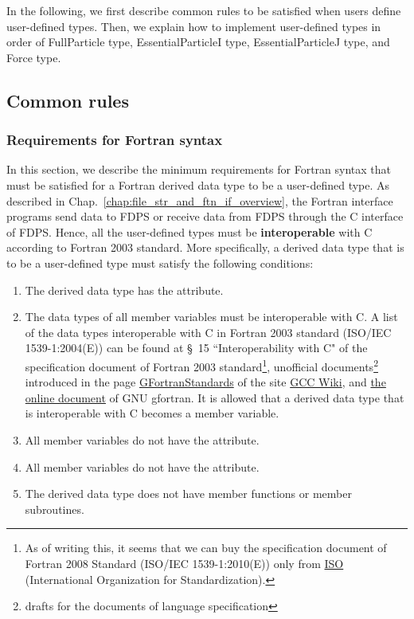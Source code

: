 In the following, we first describe common rules to be satisfied when users define user-defined types. Then, we explain how to implement user-defined types in order of FullParticle type, EssentialParticleI type, EssentialParticleJ type, and Force type.

\subsection{Common rules}
\label{subsec:common_rules_for_user_defined_types}
\subsubsection{Requirements for Fortran syntax}
\label{s2sec:requirements_for_fortran_grammer}
In this section, we describe the minimum requirements for Fortran syntax that must be satisfied for a Fortran derived data type to be a user-defined type. As described in Chap.~\ref{chap:file_str_and_ftn_if_overview}, the Fortran interface programs send data to FDPS or receive data from FDPS through the C interface of FDPS. Hence, all the user-defined types must be \textbf{interoperable} with C according to Fortran 2003 standard. More specifically, a derived data type that is to be a user-defined type must satisfy the following conditions:
\begin{enumerate}[leftmargin=*,itemsep=-1ex,label=(\arabic*)]
\item The derived data type has the  attribute.
\item The data types of all member variables must be interoperable with C. A list of the data types interoperable with C in Fortran 2003 standard (ISO/IEC 1539-1:2004(E)) can be found at \S~15 ``Interoperability with C" of the specification document of Fortran 2003 standard\footnote{ As of writing this, it seems that we can buy the specification document of Fortran 2008 Standard (ISO/IEC 1539-1:2010(E)) only from \href{http://www.iso.org/iso/home.htm}{ISO} (International Organization for Standardization).}, unofficial documents\footnote{drafts for the documents of language specification} introduced in the page \href{https://gcc.gnu.org/wiki/GFortranStandards}{GFortranStandards} of the site \href{https://gcc.gnu.org/wiki/HomePage}{GCC Wiki}, and \href{https://gcc.gnu.org/onlinedocs/gfortran/ISO_005fC\_005fBINDING.html#ISO\_005fC\_005fBINDING}{the online document} of GNU gfortran. It is allowed that a derived data type that is interoperable with C becomes a member variable.
\item All member variables do not have the  attribute.
\item All member variables do not have the  attribute.
\item The derived data type does not have member functions or member subroutines.
\end{enumerate}

